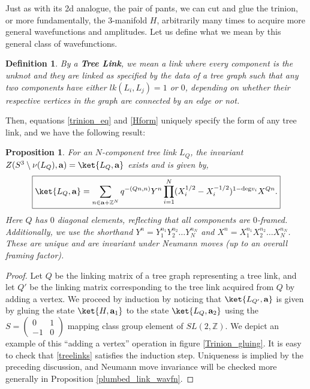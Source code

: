 \documentclass{article}
\newcommand{\Z}{{\mathbb Z}}
\def\be{\begin{equation}}
\def\ee{\end{equation}}
\newtheorem{proposition}{Proposition}[section]
\newtheorem{definition}{Definition}
\numberwithin{corollary}{theorem}
\numberwithin{corollary}{proposition}
\begin{document}
Just as with its 2d analogue, the pair of pants, we can cut and glue the trinion, or more fundamentally, the 3-manifold $H$, arbitrarily many times to acquire more general wavefunctions and amplitudes. Let us define what we mean by this general class of wavefunctions. 
\begin{definition}
    By a \textbf{Tree Link}, we mean a link where every component is the unknot and they are linked as specified by the data of a tree graph such that any two components have either $lk(L_i,L_j)=1$ or $0$, depending on whether their respective vertices in the graph are connected by an edge or not.
\end{definition} 
Then, equations \eqref{trinion_eq} and \eqref{Hform} uniquely specify the form of any tree link, and we have the following result:
\begin{proposition} \label{treelinks_wvfn}
For an $N$-component tree link $L_Q$, the invariant $Z(S^3 \setminus \nu(L_Q),\mathbf{a}) =\ket{L_Q,\mathbf{a}}$ exists and is given by, 
\be \label{treelinks} \boxed{\ket{L_Q,\mathbf{a}} = \sum_{n \in \mathbf{a} + \Z^N } q^{-(Qn,n)} Y^n \prod^N_{i=1}(X_i^{1/2} - X_i^{-1/2})^{1-\mathrm{deg}v_i} X^{Q n}.} \ee
Here $Q$ has $0$ diagonal elements, reflecting that all components are $0$-framed. Additionally, we use the shorthand $Y^n = Y_1^{n_1} Y_2^{n_2}\ldots Y_N^{n_N} $ and $X^n =X_1^{n_1} X_2^{n_2}\ldots X_N^{n_N} $. These are unique and are invariant under Neumann moves (up to an overall framing factor). 
\end{proposition}
\begin{proof}
    Let $Q$ be the linking matrix of a tree graph representing a tree link, and let $Q'$ be the linking matrix corresponding to the tree link acquired from $Q$ by adding a vertex. We proceed by induction by noticing that $\ket{L_{Q'},\mathbf{a}}$ is given by gluing the state $\ket{H,\mathbf{a}_1}$ to the state $\ket{L_Q,\mathbf{a}_2}$ using the $S= \begin{pmatrix}
    0&1\\-1&0
\end{pmatrix}$ mapping class group element of $SL(2,\Z)$. We depict an example of this ``adding a vertex'' operation in figure \ref{Trinion_gluing}. It is easy to check that \eqref{treelinks} satisfies the induction step. Uniqueness is implied by the preceding discussion, and Neumann move invariance will be checked more generally in Proposition \ref{plumbed_link_wavfn}.
\end{proof}
\end{document}
